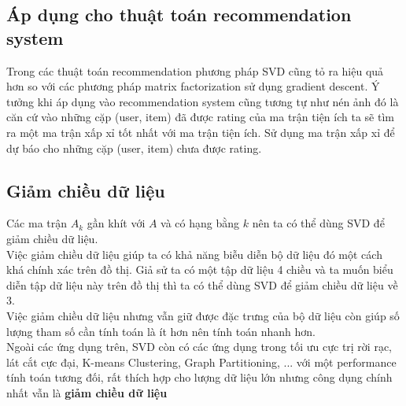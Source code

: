 \subsection{Áp dụng cho thuật toán recommendation system}
Trong các thuật toán recommendation phương pháp SVD cũng tỏ ra hiệu quả hơn so với các phương pháp matrix factorization sử dụng gradient descent. Ý tưởng khi áp dụng vào recommendation system cũng tương tự như nén ảnh đó là căn cứ vào những cặp (user, item) đã được rating của ma trận tiện ích ta sẽ tìm ra một ma trận xấp xỉ tốt nhất với ma trận tiện ích. Sử dụng ma trận xấp xỉ để dự báo cho những cặp (user, item) chưa được rating.
\subsection{Giảm chiều dữ liệu }
Các ma trận $A_k$ gần khít với $A$ và có hạng bằng $k$ nên ta có thể dùng SVD để giảm chiều dữ liệu.\\
Việc giảm chiều dữ liệu giúp ta có khả năng biễu diễn bộ dữ liệu đó một cách khá chính xác trên đồ thị. Giả sử ta có một tập dữ liệu 4 chiều và ta muốn biểu diễn tập dữ liệu này trên đồ thị thì ta có thể dùng SVD để giảm chiều dữ liệu về 3.\\
Việc giảm chiều dữ liệu nhưng vẫn giữ được đặc trưng của bộ dữ liệu còn giúp số lượng tham số cần tính toán là ít hơn nên tính toán nhanh hơn.
\\
Ngoài các ứng dụng trên, SVD còn có các ứng dụng trong tối ưu cực trị rời rạc, lát cắt cực đại, K-means Clustering, Graph Partitioning, ... với một performance tính toán tương đối, rất thích hợp cho lượng dữ liệu lớn nhưng công dụng chính nhất vẫn là \textbf{giảm chiều dữ liệu}









































